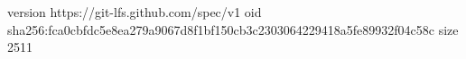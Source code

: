 version https://git-lfs.github.com/spec/v1
oid sha256:fca0cbfdc5e8ea279a9067d8f1bf150cb3c2303064229418a5fe89932f04c58c
size 2511
